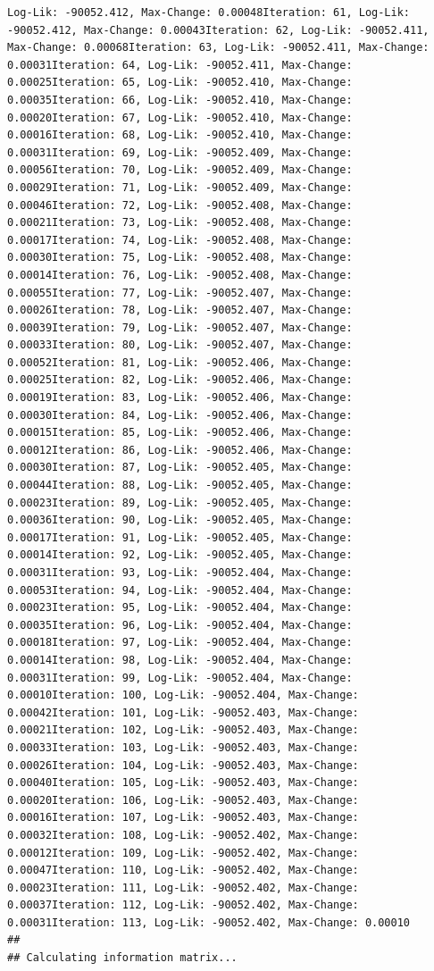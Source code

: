 \documentclass[
  english,
  man]{apa6}
\begin{document}
\begin{verbatim}
Log-Lik: -90052.412, Max-Change: 0.00048Iteration: 61, Log-Lik: -90052.412, Max-Change: 0.00043Iteration: 62, Log-Lik: -90052.411, Max-Change: 0.00068Iteration: 63, Log-Lik: -90052.411, Max-Change: 0.00031Iteration: 64, Log-Lik: -90052.411, Max-Change: 0.00025Iteration: 65, Log-Lik: -90052.410, Max-Change: 0.00035Iteration: 66, Log-Lik: -90052.410, Max-Change: 0.00020Iteration: 67, Log-Lik: -90052.410, Max-Change: 0.00016Iteration: 68, Log-Lik: -90052.410, Max-Change: 0.00031Iteration: 69, Log-Lik: -90052.409, Max-Change: 0.00056Iteration: 70, Log-Lik: -90052.409, Max-Change: 0.00029Iteration: 71, Log-Lik: -90052.409, Max-Change: 0.00046Iteration: 72, Log-Lik: -90052.408, Max-Change: 0.00021Iteration: 73, Log-Lik: -90052.408, Max-Change: 0.00017Iteration: 74, Log-Lik: -90052.408, Max-Change: 0.00030Iteration: 75, Log-Lik: -90052.408, Max-Change: 0.00014Iteration: 76, Log-Lik: -90052.408, Max-Change: 0.00055Iteration: 77, Log-Lik: -90052.407, Max-Change: 0.00026Iteration: 78, Log-Lik: -90052.407, Max-Change: 0.00039Iteration: 79, Log-Lik: -90052.407, Max-Change: 0.00033Iteration: 80, Log-Lik: -90052.407, Max-Change: 0.00052Iteration: 81, Log-Lik: -90052.406, Max-Change: 0.00025Iteration: 82, Log-Lik: -90052.406, Max-Change: 0.00019Iteration: 83, Log-Lik: -90052.406, Max-Change: 0.00030Iteration: 84, Log-Lik: -90052.406, Max-Change: 0.00015Iteration: 85, Log-Lik: -90052.406, Max-Change: 0.00012Iteration: 86, Log-Lik: -90052.406, Max-Change: 0.00030Iteration: 87, Log-Lik: -90052.405, Max-Change: 0.00044Iteration: 88, Log-Lik: -90052.405, Max-Change: 0.00023Iteration: 89, Log-Lik: -90052.405, Max-Change: 0.00036Iteration: 90, Log-Lik: -90052.405, Max-Change: 0.00017Iteration: 91, Log-Lik: -90052.405, Max-Change: 0.00014Iteration: 92, Log-Lik: -90052.405, Max-Change: 0.00031Iteration: 93, Log-Lik: -90052.404, Max-Change: 0.00053Iteration: 94, Log-Lik: -90052.404, Max-Change: 0.00023Iteration: 95, Log-Lik: -90052.404, Max-Change: 0.00035Iteration: 96, Log-Lik: -90052.404, Max-Change: 0.00018Iteration: 97, Log-Lik: -90052.404, Max-Change: 0.00014Iteration: 98, Log-Lik: -90052.404, Max-Change: 0.00031Iteration: 99, Log-Lik: -90052.404, Max-Change: 0.00010Iteration: 100, Log-Lik: -90052.404, Max-Change: 0.00042Iteration: 101, Log-Lik: -90052.403, Max-Change: 0.00021Iteration: 102, Log-Lik: -90052.403, Max-Change: 0.00033Iteration: 103, Log-Lik: -90052.403, Max-Change: 0.00026Iteration: 104, Log-Lik: -90052.403, Max-Change: 0.00040Iteration: 105, Log-Lik: -90052.403, Max-Change: 0.00020Iteration: 106, Log-Lik: -90052.403, Max-Change: 0.00016Iteration: 107, Log-Lik: -90052.403, Max-Change: 0.00032Iteration: 108, Log-Lik: -90052.402, Max-Change: 0.00012Iteration: 109, Log-Lik: -90052.402, Max-Change: 0.00047Iteration: 110, Log-Lik: -90052.402, Max-Change: 0.00023Iteration: 111, Log-Lik: -90052.402, Max-Change: 0.00037Iteration: 112, Log-Lik: -90052.402, Max-Change: 0.00031Iteration: 113, Log-Lik: -90052.402, Max-Change: 0.00010
## 
## Calculating information matrix...
\end{verbatim}
\end{document}
